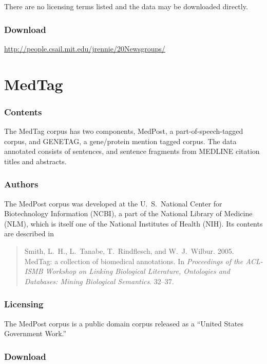 There are no licensing terms listed and the data may be downloaded
directly.

\subsubsection{Download}

\url{http://people.csail.mit.edu/jrennie/20Newsgroups/}




\section{MedTag}\label{section:corpora-medtag}

\subsubsection{Contents}

The MedTag corpus has two components, MedPost, a part-of-speech-tagged
corpus, and GENETAG, a gene/protein mention tagged corpus.  The data
annotated consists of sentences, and sentence fragments from MEDLINE
citation titles and abstracts.

\subsubsection{Authors}

The MedPost corpus was developed at the U.~S.~National Center for
Biotechnology Information (NCBI), a part of the National Library of
Medicine (NLM), which is itself one of the National Institutes of
Health (NIH).  Its contents are described in
%
\begin{quote}
Smith, L.~H., L.~Tanabe, T.~Rindflesch, and W.~J.~Wilbur.
2005. MedTag: a collection of biomedical annotations.  In {\it
  Proceedings of the ACL-ISMB Workshop on Linking Biological
  Literature, Ontologies and Databases: Mining Biological
  Semantics}. 32--37.
\end{quote}

\subsubsection{Licensing}

The MedPost corpus is a public domain corpus released as a ``United
States Government Work.''

\subsubsection{Download}

